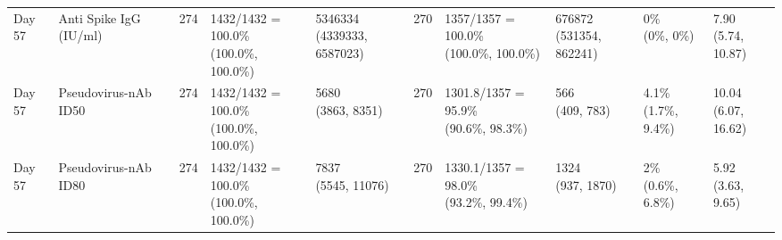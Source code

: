 \documentclass[]{book}
\theoremstyle{definition}
\theoremstyle{definition}
\theoremstyle{definition}
\newcommand{\1}{\mathbbm{1}}
\begin{document}
\begin{landscape}
\begin{ThreePartTable}
\begin{longtable}[t]{>{\raggedright\arraybackslash}p{1cm}lllllllll}
\addlinespace
Day 57 & Anti Spike IgG (IU/ml) & 274 & \makecell[l]{1432/1432 = 100.0\%\\(100.0\%, 100.0\%)} & \makecell[l]{5346334\\(4339333, 6587023)} & 270 & \makecell[l]{1357/1357 = 100.0\%\\(100.0\%, 100.0\%)} & \makecell[l]{676872\\(531354, 862241)} & \makecell[l]{0\%\\(0\%, 0\%)} & \makecell[l]{7.90\\(5.74, 10.87)}\\
Day 57 & Pseudovirus-nAb ID50 & 274 & \makecell[l]{1432/1432 = 100.0\%\\(100.0\%, 100.0\%)} & \makecell[l]{5680\\(3863, 8351)} & 270 & \makecell[l]{1301.8/1357 = 95.9\%\\(90.6\%, 98.3\%)} & \makecell[l]{566\\(409, 783)} & \makecell[l]{4.1\%\\(1.7\%, 9.4\%)} & \makecell[l]{10.04\\(6.07, 16.62)}\\
Day 57 & Pseudovirus-nAb ID80 & 274 & \makecell[l]{1432/1432 = 100.0\%\\(100.0\%, 100.0\%)} & \makecell[l]{7837\\(5545, 11076)} & 270 & \makecell[l]{1330.1/1357 = 98.0\%\\(93.2\%, 99.4\%)} & \makecell[l]{1324\\(937, 1870)} & \makecell[l]{2\%\\(0.6\%, 6.8\%)} & \makecell[l]{5.92\\(3.63, 9.65)}\\*
\end{longtable}
\end{ThreePartTable}


\clearpage


\end{landscape}
\end{document}
